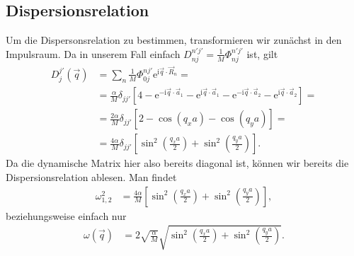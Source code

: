 \documentclass[english, parskip=full]{scrartcl}
\newcommand{\kla}{}
\newcommand{\klam}{}
\renewcommand{\i}{\text{i}}
\newcommand{\e}{\text{e}}
\begin{document}
\subsection{Dispersionsrelation}
Um die Dispersonsrelation zu bestimmen, transformieren wir zunächst in den Impulsraum.
Da in unserem Fall einfach $D_{nj}^{n'j'} = \frac{1}{M}\Phi_{nj}^{n'j'}$ ist, gilt
\begin{align}
D_j^{j'}(\vec{q}) &= \sum_n \frac{1}{M}\Phi_{0j}^{nj'} \e^{\i\vec{q}\cdot\vec{R}_n} = \\
&= \frac{\alpha}{M}\delta_{jj'} \klam\left[ 4 - \e^{-\i\vec{q}\cdot\vec{a}_1} - \e^{\i\vec{q}\cdot\vec{a}_1} - \e^{-\i\vec{q}\cdot\vec{a}_2} - \e^{\i\vec{q}\cdot\vec{a}_2} \right] = \\
&= \frac{2\alpha}{M}\delta_{jj'} \klam\left[ 2 - \cos(q_xa) - \cos(q_ya) \right] = \\
&= \frac{4\alpha}{M}\delta_{jj'} \klam\left[ \sin^2\kla\left( \frac{q_xa}{2} \right) + \sin^2\kla\left( \frac{q_ya}{2} \right) \right].
\end{align}
Da die dynamische Matrix hier also bereits diagonal ist, können wir bereits die Dispersionsrelation ablesen.
Man findet 
\begin{align}
\omega_{1,2}^2 &= \frac{4\alpha}{M} \klam\left[ \sin^2\kla\left( \frac{q_xa}{2} \right) + \sin^2\kla\left( \frac{q_ya}{2} \right) \right],
\end{align}
beziehungsweise einfach nur
\begin{align}
\omega(\vec{q}) &= 2\sqrt{\frac{\alpha}{M}} \sqrt{ \sin^2\kla\left( \frac{q_xa}{2} \right) + \sin^2\kla\left( \frac{q_ya}{2} \right) }.
\end{align}
\end{document}
